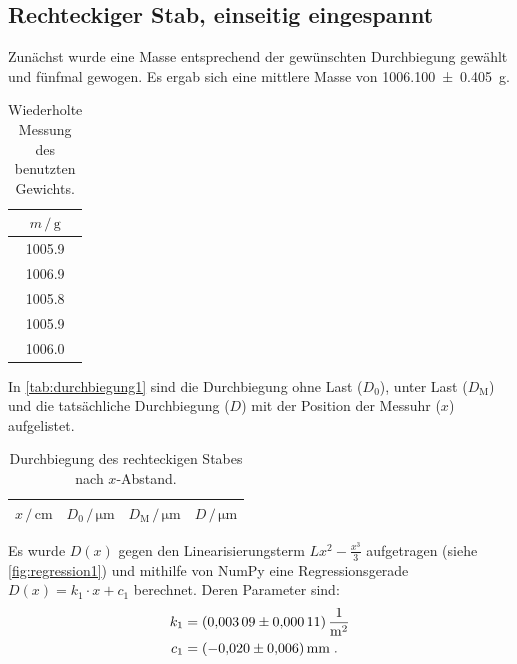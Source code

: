 \subsection{Rechteckiger Stab, einseitig eingespannt} \label{sec:auswertung_einseitig_rechteckig}
Zunächst wurde eine Masse entsprechend der gewünschten Durchbiegung gewählt und fünfmal gewogen.
Es ergab sich eine mittlere Masse von \SI{1006.100 \pm 0.405}{\gram}.

\begin{table}
\centering
\caption{Wiederholte Messung des benutzten Gewichts.}
\begin{tabular}{c}
\toprule
$m \,/\, \si{\gram}$ \\
\midrule
\num{1005.9} \\
\num{1006.9} \\
\num{1005.8} \\
\num{1005.9} \\
\num{1006.0} \\
\bottomrule
\end{tabular}
\end{table}


In \autoref{tab:durchbiegung1} sind die Durchbiegung ohne Last ($D_\text{0}$), unter Last ($D_\text{M}$) und die tatsächliche Durchbiegung ($D$) mit der Position der Messuhr ($x$) aufgelistet.

\begin{table}
\centering
\caption{Durchbiegung des rechteckigen Stabes nach $x$-Abstand.}
\label{tab:durchbiegung1}
\begin{tabular}{c c c c}
\toprule
$x \,/\, \si{\centi\meter}$ &
$D_0 \,/\, \si{\micro\meter}$ &
$D_\text{M} \,/\, \si{\micro\meter}$ &
$D \,/\, \si{\micro\meter}$ \\
\midrule

\bottomrule
\end{tabular}
\end{table}

\FloatBarrier

Es wurde $D(x)$ gegen den Linearisierungsterm $Lx^2-\frac{x^3}{3}$ aufgetragen (siehe \autoref{fig:regression1})
und mithilfe von NumPy eine Regressionsgerade $D(x) = k_1 \cdot x + c_1$ berechnet.
Deren Parameter sind:
\begin{align*}
  k_1 &= \SI{0.00309 \pm 0.00011}{\meter\tothe{-2}} \\
  c_1 &= \SI{-0.020 \pm 0.006}{\milli\meter} \; .
\end{align*}

